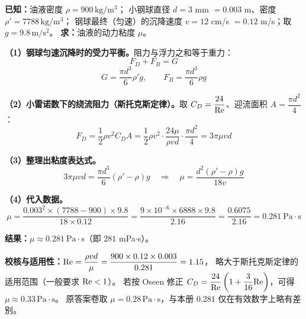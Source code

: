 \begin{jie}
\textbf{已知：}油液密度 $\rho=900\,\mathrm{kg/m^{3}}$；
小钢球直径 $d=3$ mm $=0.003$ m、密度 $\rho'=7788\,\mathrm{kg/m^{3}}$；
钢球最终（匀速）的沉降速度 $v=12$ cm/s $=0.12$ m/s；取 $g=9.8\,\mathrm{m/s^{2}}$。
\textbf{求：}油液的动力粘度 $\mu$。

\textbf{（1）钢球匀速沉降时的受力平衡。}阻力与浮力之和等于重力：
\[
F_D+F_B=G
\]
\[
G=\frac{\pi d^{3}}{6}\rho'g,
\qquad
F_B=\frac{\pi d^{3}}{6}\rho g
\]

\textbf{（2）小雷诺数下的绕流阻力（斯托克斯定律）。}取 $C_D=\dfrac{24}{\mathrm{Re}}$、迎流面积 $A=\dfrac{\pi d^{2}}{4}$：
\[
F_D=\frac{1}{2}\rho v^{2}C_DA
=\frac{1}{2}\rho v^{2}\cdot\frac{24\mu}{\rho vd}\cdot\frac{\pi d^{2}}{4}
=3\pi\mu vd
\]

\textbf{（3）整理出粘度表达式。}
\[
3\pi\mu vd=\frac{\pi d^{3}}{6}\left(\rho'-\rho\right)g
\quad\Longrightarrow\quad
\mu=\frac{d^{2}\left(\rho'-\rho\right)g}{18v}
\]

\textbf{（4）代入数据。}
\[
\mu=\frac{0.003^{2}\times(7788-900)\times9.8}{18\times0.12}
=\frac{9\times10^{-6}\times6888\times9.8}{2.16}
=\frac{0.6075}{2.16}=0.281\ \mathrm{Pa\cdot s}
\]

\textbf{结果：}$\boxed{\mu\approx0.281\ \mathrm{Pa\cdot s}}$（即 $281$ mPa$\cdot$s）。
\end{jie}

\begin{tishi}
\textbf{校核与适用性：}$\mathrm{Re}=\dfrac{\rho vd}{\mu}=\dfrac{900\times0.12\times0.003}{0.281}=1.15$，
略大于斯托克斯定律的适用范围（一般要求 $\mathrm{Re}<1$）。
若按 Oseen 修正 $C_D=\dfrac{24}{\mathrm{Re}}\left(1+\dfrac{3}{16}\mathrm{Re}\right)$，可得 $\mu\approx0.33\,\mathrm{Pa\cdot s}$。
原答案卷取 $\mu=0.28\,\mathrm{Pa\cdot s}$，与本册 $0.281$ 仅在有效数字上略有差别。
\end{tishi}


